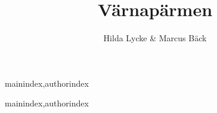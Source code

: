 \documentclass[10pt, a4paper]{article}
\title{Värnapärmen}
\author{Hilda Lycke \& Marcus Bäck}
\begin{document}
\maketitle
{}

\renewcommand{\thesongnum}{S\arabic{songnum}}
  
\begin{songs}{mainindex,authorindex}
  
  
  
  
  
  
  
  
  
  
  
  
\end{songs}

\renewcommand{\thesongnum}{E\arabic{songnum}}
\begin{songs}{mainindex,authorindex}
  
   
   
   
   
   
   
   
   
\end{songs}

\end{document}
